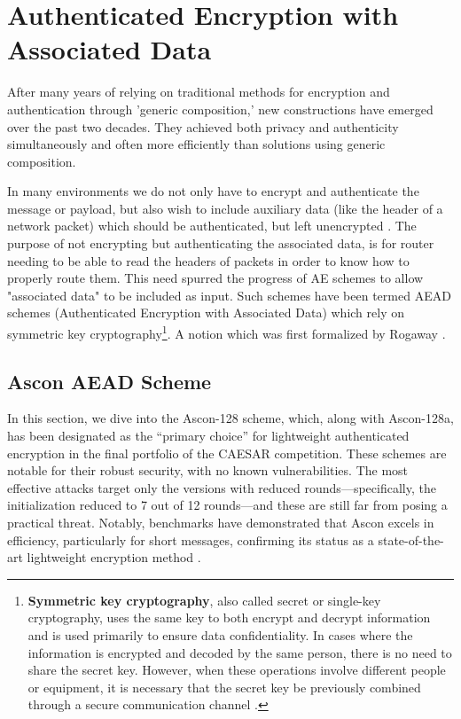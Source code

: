 \section{Authenticated Encryption with Associated Data}
After many years of relying on traditional methods for encryption and authentication through 'generic composition,' new constructions have emerged over the past two decades. They achieved both privacy and authenticity simultaneously and often more efficiently than solutions using generic composition. \par

In many environments we do not only have to encrypt and authenticate the message or payload, but also wish to include auxiliary data (like the header of a network packet) which should be authenticated, but left unencrypted \cite[Chapter 1]{Black2005}.
The purpose of not encrypting but authenticating the associated data, is for router needing to be able to read the headers of packets in order to know how to properly route them. This need spurred the progress of AE schemes to allow "associated data" to be included as input. Such schemes have been termed AEAD schemes (Authenticated Encryption with Associated Data) which rely on symmetric key cryptography\footnote[1]{\textbf{Symmetric key cryptography}, also called secret or single-key cryptography, uses the same key to both encrypt and decrypt information and is used primarily to ensure data confidentiality. In cases where the information is encrypted and decoded by the same person, there is no need to share the secret key. However, when these operations involve different people or equipment, it is necessary that the secret key be previously combined through a secure communication channel \cite{Alencar2022Cryptography}.}\cite[Chapter 1]{Black2005}.
A notion which was first formalized by Rogaway \cite{10.1145/586110.586125}. \par

\subsection{Ascon AEAD Scheme}
In this section, we dive into the Ascon-128 scheme, which, along with Ascon-128a, has been designated as the “primary choice” for lightweight authenticated encryption in the final portfolio of the CAESAR competition. These schemes are notable for their robust security, with no known vulnerabilities. The most effective attacks target only the versions with reduced rounds—specifically, the initialization reduced to 7 out of 12 rounds—and these are still far from posing a practical threat. Notably, benchmarks have demonstrated that Ascon excels in efficiency, particularly for short messages, confirming its status as a state-of-the-art lightweight encryption method \cite[Chapter 1]{DBLP:journals/joc/DobraunigEMS21}. \par

